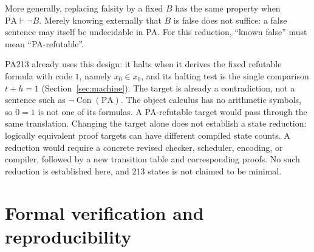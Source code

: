 \documentclass[11pt,letterpaper]{article}
\newcommand{\PA}{\mathrm{PA}}
\newcommand{\Con}{\operatorname{Con}}
\begin{document}
More generally, replacing falsity by a fixed $B$ has the same property
when $\PA\vdash\neg B$. Merely knowing externally that $B$ is false
does not suffice: a false sentence may itself be undecidable in PA.
For this reduction, ``known false'' must mean ``PA-refutable''.

PA213 already uses this design: it halts when it derives the fixed
refutable formula with code $1$, namely $x_0\in x_0$, and its halting test is
the single comparison $t+h=1$ (Section~\ref{sec:machine}). The target is
already a contradiction, not a sentence such as $\neg\Con(\PA)$. The
object calculus has no arithmetic symbols, so $0=1$ is not one of its
formulas. A PA-refutable target would pass through the same translation.
Changing the target alone does not establish a state reduction: logically
equivalent proof targets can have different compiled state counts. A reduction
would require a concrete revised checker, scheduler, encoding, or
compiler, followed by a new transition table and corresponding proofs.
No such reduction is established here, and 213 states is not claimed to
be minimal.

\section{Formal verification and reproducibility}\label{sec:checked}
\end{document}

